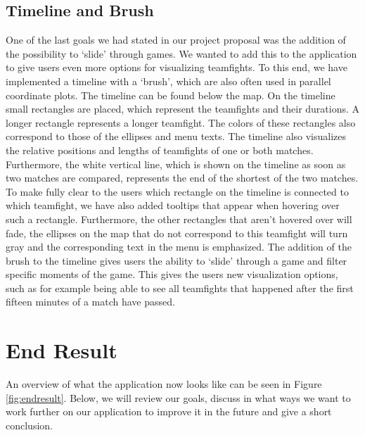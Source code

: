 \documentclass[11pt,twoside,a4paper]{article}
\begin{document}
\subsection{Timeline and Brush}
\label{subsec:timeline}
One of the last goals we had stated in our project proposal was the addition of the possibility to `slide' through games. We wanted to add this to the application to give users even more options for visualizing teamfights. To this end, we have implemented a timeline with a `brush', which are also often used in parallel coordinate plots.\newline
The timeline can be found below the map. On the timeline small rectangles are placed, which represent the teamfights and their durations. A longer rectangle represents a longer teamfight. The colors of these rectangles also correspond to those of the ellipses and menu texts. The timeline also visualizes the relative positions and lengths of teamfights of one or both matches. Furthermore, the white vertical line, which is shown on the timeline as soon as two matches are compared, represents the end of the shortest of the two matches. To make fully clear to the users which rectangle on the timeline is connected to which teamfight, we have also added tooltips that appear when hovering over such a rectangle. Furthermore, the other rectangles that aren't hovered over will fade, the ellipses on the map that do not correspond to this teamfight will turn gray and the corresponding text in the menu is emphasized. \newline\newline
The addition of the brush to the timeline gives users the ability to `slide' through a game and filter specific moments of the game. This gives the users new visualization options, such as for example being able to see all teamfights that happened after the first fifteen minutes of a match have passed. 

\section{End Result}
\label{sec:endresult}
An overview of what the application now looks like can be seen in Figure \ref{fig:endresult}. Below, we will review our goals, discuss in what ways we want to work further on our application to improve it in the future and give a short conclusion.
\end{document}
